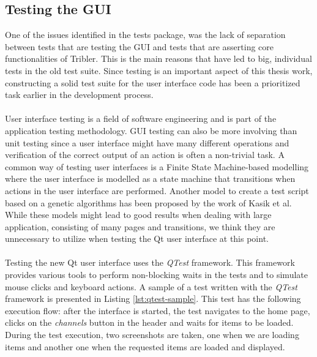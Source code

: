 \subsection{Testing the GUI}
One of the issues identified in the tests package, was the lack of separation between tests that are testing the GUI and tests that are asserting core functionalities of Tribler. This is the main reasons that have led to big, individual tests in the old test suite. Since testing is an important aspect of this thesis work, constructing a solid test suite for the user interface code has been a prioritized task earlier in the development process.\\\\
User interface testing is a field of software engineering and is part of the application testing methodology. GUI testing can also be more involving than unit testing since a user interface might have many different operations and verification of the correct output of an action is often a non-trivial task. A common way of testing user interfaces is a Finite State Machine-based modelling where the user interface is modelled as a state machine that transitions when actions in the user interface are performed\cite{clarke1998automated}\cite{belli2001finite}. Another model to create a test script based on a genetic algorithms has been proposed by the work of Kasik et al\cite{kasik1996toward}. While these models might lead to good results when dealing with large application, consisting of many pages and transitions, we think they are unnecessary to utilize when testing the Qt user  interface at this point.\\\\
Testing the new Qt user interface uses the \emph{QTest} framework. This framework provides various tools to perform non-blocking waits in the tests and to simulate mouse clicks and keyboard actions. A sample of a test written with the \emph{QTest} framework is presented in Listing \ref{lst:qtest-sample}. This test has the following execution flow: after the interface is started, the test navigates to the home page, clicks on the \emph{channels} button in the header and waits for items to be loaded. During the test execution, two screenshots are taken, one when we are loading items and another one when the requested items are loaded and displayed.\\\\
